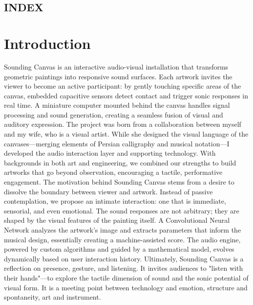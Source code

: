 \documentclass{article}
\title{\titolo}
\author{\autore}
\begin{document}
 
\begin{titlepage}
\clearpage\maketitle
\thispagestyle{empty}
\end{titlepage}

\begin{centering}
	\section*{INDEX}
\end{centering}
\renewcommand*\contentsname{ }
\tableofcontents
\listoffigures
\listoftables



\newpage



\section{Introduction}
Sounding Canvas is an interactive audio-visual installation that transforms geometric paintings into responsive sound surfaces. Each artwork invites the viewer to become an active participant: by gently touching specific areas of the canvas, embedded capacitive sensors detect contact and trigger sonic responses in real time. A miniature computer mounted behind the canvas handles signal processing and sound generation, creating a seamless fusion of visual and auditory expression. \newline
The project was born from a collaboration between myself and my wife, who is a visual artist. While she designed the visual language of the canvases—merging elements of Persian calligraphy and musical notation—I developed the audio interaction layer and supporting technology. With backgrounds in both art and engineering, we combined our strengths to build artworks that go beyond observation, encouraging a tactile, performative engagement. \newline 
The motivation behind Sounding Canvas stems from a desire to dissolve the boundary between viewer and artwork. Instead of passive contemplation, we propose an intimate interaction: one that is immediate, sensorial, and even emotional. 
 The sound responses are not arbitrary; they are shaped by the visual features of the painting itself. \newline
A Convolutional Neural Network analyzes the artwork’s image and extracts parameters that inform the musical design, essentially creating a machine-assisted score. The audio engine, powered by custom algorithms and guided by a mathematical model, evolves dynamically based on user interaction history.
\newline
Ultimately, Sounding Canvas is a reflection on presence, gesture, and listening. It invites audiences to "listen with their hands"—to explore the tactile dimension of sound and the sonic potential of visual form. It is a meeting point between technology and emotion, structure and spontaneity, art and instrument.
\end{document}
